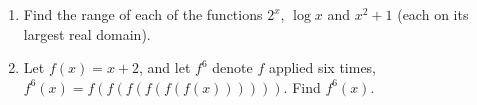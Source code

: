 \begin{enumerate}
\item[(a)] Find the range of each of the functions $2^x$, $\log x$ and $x^2+1$ (each on its largest real domain).
\item[(b)] Let $f(x)=x+2$, and let $f^6$ denote $f$ applied six times, $f^6(x)=f(f(f(f(f(f(x))))))$. Find $f^6(x)$.
\end{enumerate}
